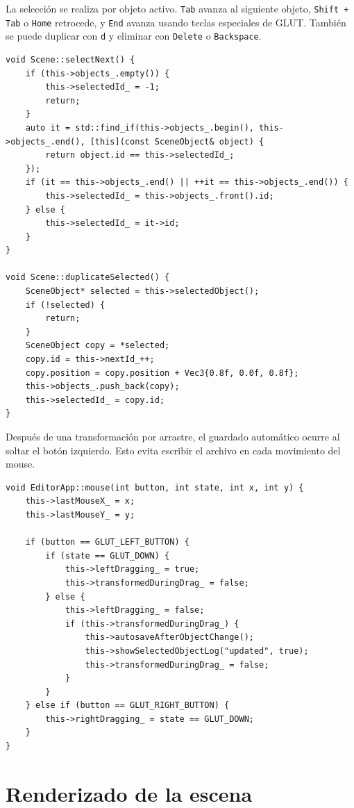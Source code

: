 \documentclass[a4paper,12pt]{article}
\begin{document}
La selección se realiza por objeto activo. \texttt{Tab} avanza al siguiente objeto, \texttt{Shift + Tab} o \texttt{Home} retrocede, y \texttt{End} avanza usando teclas especiales de GLUT. También se puede duplicar con \texttt{d} y eliminar con \texttt{Delete} o \texttt{Backspace}.


\begin{lstlisting}
void Scene::selectNext() {
    if (this->objects_.empty()) {
        this->selectedId_ = -1;
        return;
    }
    auto it = std::find_if(this->objects_.begin(), this->objects_.end(), [this](const SceneObject& object) {
        return object.id == this->selectedId_;
    });
    if (it == this->objects_.end() || ++it == this->objects_.end()) {
        this->selectedId_ = this->objects_.front().id;
    } else {
        this->selectedId_ = it->id;
    }
}

void Scene::duplicateSelected() {
    SceneObject* selected = this->selectedObject();
    if (!selected) {
        return;
    }
    SceneObject copy = *selected;
    copy.id = this->nextId_++;
    copy.position = copy.position + Vec3{0.8f, 0.0f, 0.8f};
    this->objects_.push_back(copy);
    this->selectedId_ = copy.id;
}
\end{lstlisting}

Después de una transformación por arrastre, el guardado automático ocurre al soltar el botón izquierdo. Esto evita escribir el archivo en cada movimiento del mouse.

\begin{lstlisting}
void EditorApp::mouse(int button, int state, int x, int y) {
    this->lastMouseX_ = x;
    this->lastMouseY_ = y;

    if (button == GLUT_LEFT_BUTTON) {
        if (state == GLUT_DOWN) {
            this->leftDragging_ = true;
            this->transformedDuringDrag_ = false;
        } else {
            this->leftDragging_ = false;
            if (this->transformedDuringDrag_) {
                this->autosaveAfterObjectChange();
                this->showSelectedObjectLog("updated", true);
                this->transformedDuringDrag_ = false;
            }
        }
    } else if (button == GLUT_RIGHT_BUTTON) {
        this->rightDragging_ = state == GLUT_DOWN;
    }
}
\end{lstlisting}

\section{Renderizado de la escena}
\end{document}
